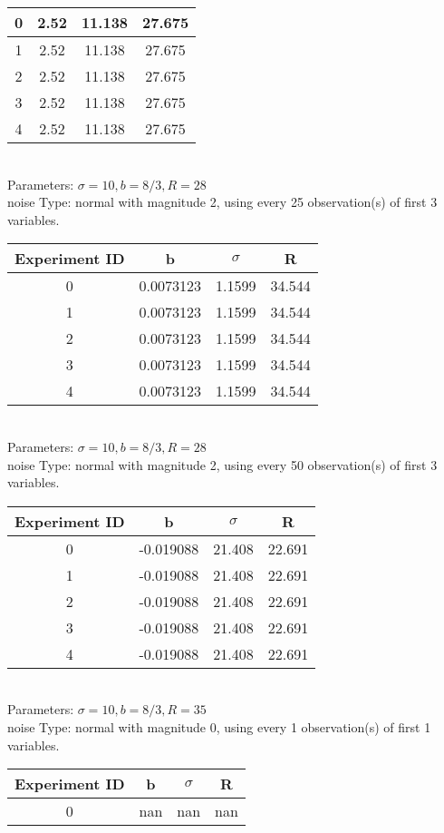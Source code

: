 \begin{multicols}{3}
\begin{tabular}{cccc}
0 & 2.52 & 11.138 & 27.675\\ \hline 
 1 & 2.52 & 11.138 & 27.675\\ \hline 
 2 & 2.52 & 11.138 & 27.675\\ \hline 
 3 & 2.52 & 11.138 & 27.675\\ \hline 
 4 & 2.52 & 11.138 & 27.675\\ \hline 
 \end{tabular}\\
Parameters: $\sigma=10, b=8/3, R=28$\\
noise Type: normal with magnitude 2, using every 25 observation(s) of first 3 variables.\\
\begin{tabular}{cccc}
\hline Experiment ID & b & $\sigma$ & R \\ \hline 
0 & 0.0073123 & 1.1599 & 34.544\\ \hline 
 1 & 0.0073123 & 1.1599 & 34.544\\ \hline 
 2 & 0.0073123 & 1.1599 & 34.544\\ \hline 
 3 & 0.0073123 & 1.1599 & 34.544\\ \hline 
 4 & 0.0073123 & 1.1599 & 34.544\\ \hline 
 \end{tabular}\\
Parameters: $\sigma=10, b=8/3, R=28$\\
noise Type: normal with magnitude 2, using every 50 observation(s) of first 3 variables.\\
\begin{tabular}{cccc}
\hline Experiment ID & b & $\sigma$ & R \\ \hline 
0 & -0.019088 & 21.408 & 22.691\\ \hline 
 1 & -0.019088 & 21.408 & 22.691\\ \hline 
 2 & -0.019088 & 21.408 & 22.691\\ \hline 
 3 & -0.019088 & 21.408 & 22.691\\ \hline 
 4 & -0.019088 & 21.408 & 22.691\\ \hline 
 \end{tabular}\\
Parameters: $\sigma=10, b=8/3, R=35$\\
noise Type: normal with magnitude 0, using every 1 observation(s) of first 1 variables.\\
\begin{tabular}{cccc}
\hline Experiment ID & b & $\sigma$ & R \\ \hline 
0 & nan & nan & nan\\ \hline 

\end{tabular}
\end{multicols}
